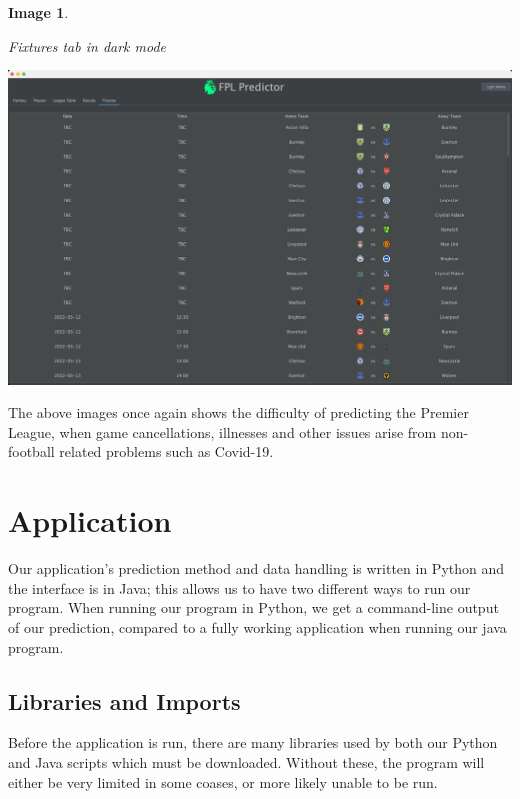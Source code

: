 \documentclass[12pt, a4paper, oneside]{book}
\newtheorem{image}[theorem]{Image}
\numberwithin{equation}{section}
\begin{document}
\begin{image} \label{Fixtures tab in dark mode}

  Fixtures tab in dark mode

  \vspace{0.5cm}

  \centerline{\includegraphics[width=1\textwidth]{images/gui/fixtures-tab/dark.png}}

\end{image}

The above images once again shows the difficulty of predicting the Premier League, when game cancellations, illnesses and other issues arise from non-football related problems such as Covid-19. 

\chapter{Application}\label{ch:7}

Our application's prediction method and data handling is written in Python and the interface is in Java; this allows us to have two different ways to run our program. When running our program in Python, we get a command-line output of our prediction, compared to a fully working application when running our java program.

\section{Libraries and Imports}\label{sec:7.1}

Before the application is run, there are many libraries used by both our Python and Java scripts which must be downloaded. Without these, the program will either be very limited in some coases, or more likely unable to be run.
\end{document}
